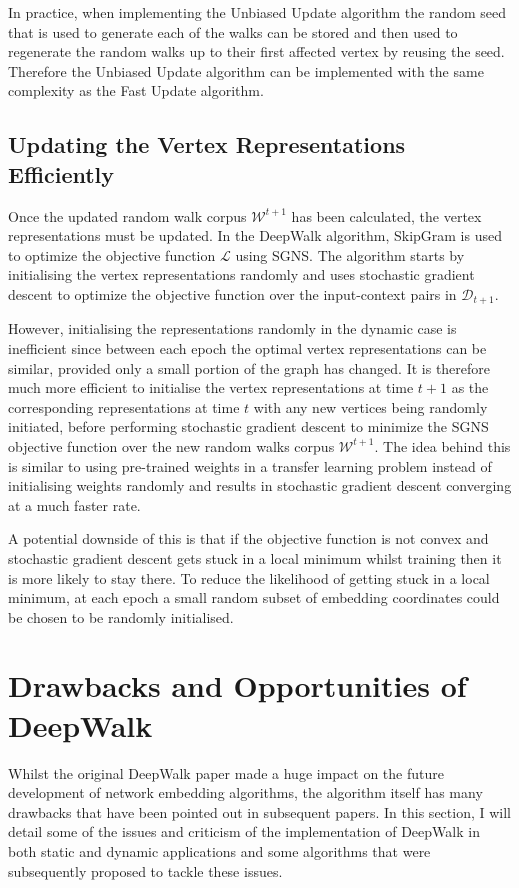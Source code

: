 \documentclass[a4paper]{article}
\newcommand{\D}{\mathcal D}
\newcommand{\W}{\mathcal W}
\begin{document}
In practice, when implementing the Unbiased Update algorithm the random seed
that is used to generate each of the walks can be stored and then used to
regenerate the random walks up to their first affected vertex by reusing the
seed. Therefore the Unbiased Update algorithm can be implemented with the same
complexity as the Fast Update algorithm.

\subsection{Updating the Vertex Representations Efficiently}
Once the updated random walk corpus $\W^{t+1}$ has been calculated, the vertex
representations must be updated. In the DeepWalk algorithm, SkipGram is used to
optimize the objective function $\mathcal{L}$ using SGNS.
The algorithm starts by initialising the vertex representations randomly and
uses stochastic gradient descent to optimize the objective function over the
input-context pairs in $\D_{t+1}$.

However, initialising the representations randomly in the dynamic case is
inefficient since between each epoch the optimal vertex representations can be similar, provided only a small portion of the graph has changed. It is therefore much more efficient to initialise the vertex
representations at time $t+1$ as the corresponding representations at time $t$
with any new vertices being randomly initiated, before performing stochastic gradient
descent to minimize the SGNS objective function over the new random walks corpus
$\W^{t+1}$. The idea behind this is similar to using pre-trained weights in a transfer
learning problem instead of initialising weights randomly and results in
stochastic gradient descent converging at a much faster rate.

A potential downside of this is that if the objective function is not convex and
stochastic gradient descent gets stuck in a local minimum whilst training then it
is more likely to stay there. To reduce the likelihood of getting stuck in a local
minimum, at each epoch a small random subset of embedding coordinates could be chosen to be randomly initialised.

\section{Drawbacks and Opportunities of DeepWalk}
Whilst the original DeepWalk paper made a huge impact on the future development
of network embedding algorithms, the algorithm itself has many drawbacks that have been pointed out in subsequent papers. In this section, I will detail some of the issues and criticism of the implementation of
DeepWalk in both static and dynamic applications and some algorithms that were subsequently proposed to tackle these issues.\\
\end{document}
